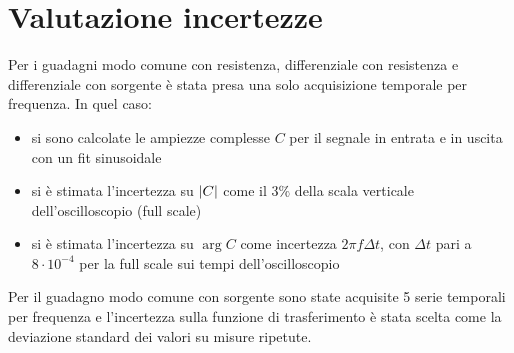 \documentclass{article}
\begin{document}
\section*{Valutazione incertezze}
Per i guadagni modo comune con resistenza, differenziale con resistenza e differenziale con sorgente è stata presa una solo acquisizione temporale per frequenza. In quel caso:
\begin{itemize}
    \item si sono calcolate le ampiezze complesse $C$ per il segnale in entrata e in uscita con un fit sinusoidale
    \item si è stimata l'incertezza su $\abs{C}$ come il $3\%$ della scala verticale dell'oscilloscopio (full scale)
    \item si è stimata l'incertezza su $\arg{C}$ come incertezza $2\pi f \Delta t$, con $\Delta t$ pari a $8\cdot 10^{-4}$ per la full scale sui tempi dell'oscilloscopio
\end{itemize}
Per il guadagno modo comune con sorgente sono state acquisite 5 serie temporali per frequenza e l'incertezza sulla funzione di trasferimento è stata scelta come la deviazione standard dei valori su misure ripetute.
\end{document}
